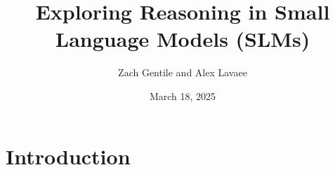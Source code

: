 \documentclass[11pt, oneside]{article}   	%
\title{Exploring Reasoning in Small Language Models (SLMs)}
\author{Zach Gentile and Alex Lavaee}
\date{March 18, 2025}
\begin{document}
\maketitle


\section*{Introduction}

\printbibliography
\end{document}

